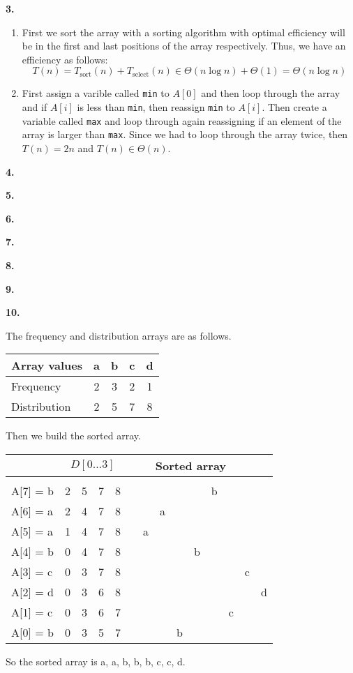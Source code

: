 \documentclass[letterpaper, 11pt]{article}
\newcommand{\hwnumber}[1]{\medskip \noindent\textbf{#1.} \smallskip}
\begin{document}
\hwnumber{3}
\begin{enumerate}[label = (\alph*)]
  \item First we sort the array with a sorting algorithm with optimal
    efficiency will be in the first and last positions of the array
    respectively. Thus, we have an efficiency as follows:
    \[T(n) = T_{\text{sort}}(n) + T_{\text{select}}(n) \in \Theta(n\log n) +
    \Theta(1) = \Theta(n \log n)\]

  \item First assign a varible called \texttt{min} to \(A[0]\) and then loop
    through the array and if \(A[i]\) is less than \texttt{min}, then reassign
    \texttt{min} to \(A[i]\). Then create a variable called \texttt{max} and
    loop through again reassigning if an element of the array is larger than
    \texttt{max}. Since we had to loop through the array twice, then \(T(n) =
    2n\) and \(T(n) \in \Theta(n)\).
\end{enumerate}

\hwnumber{4}

\hwnumber{5}

\hwnumber{6}

\hwnumber{7}

\hwnumber{8}

\hwnumber{9}

\hwnumber{10}

The frequency and distribution arrays are as follows.

\begin{center}
  \begin{tabular}{l | c c c c}
    Array values & a & b & c & d\\
    \hline
    Frequency & 2 & 3 & 2 & 1\\
    Distribution & 2 & 5 & 7 & 8
  \end{tabular}
\end{center}

Then we build the sorted array.

\begin{center}
  \begin{tabular}{l | c c c c l | c | c | c | c | c | c | c | c |}
    & \multicolumn{4}{c}{\(D[0\dots 3]\)} & \multicolumn{8}{c}{Sorted array}\\
    \hline
    \\
    A[7] = b & 2 & 5 & 7 & 8 & &  &  &  &  & b &  &  &  \\
    A[6] = a & 2 & 4 & 7 & 8 & &  & a &  &  &  &  &  &  \\
    A[5] = a & 1 & 4 & 7 & 8 & & a &  &  &  &  &  &  &  \\
    A[4] = b & 0 & 4 & 7 & 8 & &  &  &  & b &  &  &  &  \\
    A[3] = c & 0 & 3 & 7 & 8 & &  &  &  &  &  &  & c &  \\
    A[2] = d & 0 & 3 & 6 & 8 & &  &  &  &  &  &  &  & d \\
    A[1] = c & 0 & 3 & 6 & 7 & &  &  &  &  &  & c &  &  \\
    A[0] = b & 0 & 3 & 5 & 7 & &  &  & b &  &  &  &  &  \\
  \end{tabular}
\end{center}

So the sorted array is a, a, b, b, b, c, c, d. 
\end{document}
